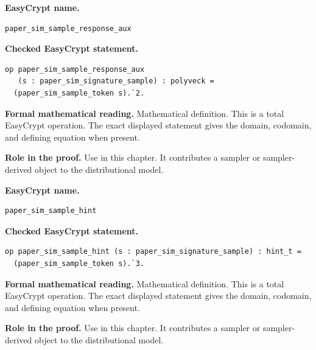 \begin{formaldefinition}
\noindent\textbf{EasyCrypt name.}
\begin{lstlisting}[language=EasyCrypt,basicstyle=\ttfamily\scriptsize]
paper_sim_sample_response_aux
\end{lstlisting}
\noindent\textbf{Checked EasyCrypt statement.}
\begin{lstlisting}[language=EasyCrypt,basicstyle=\ttfamily\scriptsize]
op paper_sim_sample_response_aux
   (s : paper_sim_signature_sample) : polyveck =
  (paper_sim_sample_token s).`2.
\end{lstlisting}
\noindent\textbf{Formal mathematical reading.}
Mathematical definition. This is a total EasyCrypt operation.  The exact displayed statement gives the domain, codomain, and defining equation when present.

\noindent\textbf{Role in the proof.}
Use in this chapter. It contributes a sampler or sampler-derived object to the distributional model.

\end{formaldefinition}

\begin{formaldefinition}
\noindent\textbf{EasyCrypt name.}
\begin{lstlisting}[language=EasyCrypt,basicstyle=\ttfamily\scriptsize]
paper_sim_sample_hint
\end{lstlisting}
\noindent\textbf{Checked EasyCrypt statement.}
\begin{lstlisting}[language=EasyCrypt,basicstyle=\ttfamily\scriptsize]
op paper_sim_sample_hint (s : paper_sim_signature_sample) : hint_t =
  (paper_sim_sample_token s).`3.
\end{lstlisting}
\noindent\textbf{Formal mathematical reading.}
Mathematical definition. This is a total EasyCrypt operation.  The exact displayed statement gives the domain, codomain, and defining equation when present.

\noindent\textbf{Role in the proof.}
Use in this chapter. It contributes a sampler or sampler-derived object to the distributional model.

\end{formaldefinition}


